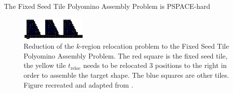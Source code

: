 \begin{theorem}
The Fixed Seed Tile Polyomino Assembly Problem is PSPACE-hard
\end{theorem}

\begin{figure}
\centering
\includegraphics[width=\textwidth]{figures/hardnessproof.pdf}
\caption[Reduction of the $k$-region relocation problem to Fixed Seed Tile Polyomino Assembly Problem]{Reduction of the $k$-region relocation problem to the Fixed Seed Tile Polyomino Assembly Problem. The red square is the fixed seed tile, the yellow tile $t_{\text{reloc}}$ needs to be relocated $3$ positions to the right in order to assemble the target shape. The blue squares are other tiles. Figure recreated and adapted from \cite{Caballero2020a}.}
\label{fig:hardnessproof}
\end{figure}

